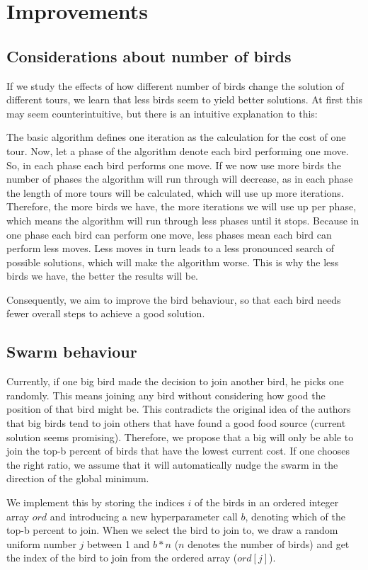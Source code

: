 \section{Improvements}
\subsection{Considerations about number of birds}
If we study the effects of how different number of birds change the solution of different tours, we learn that less birds seem to yield better solutions. At first this may seem counterintuitive, but there is an intuitive explanation to this:

The basic algorithm defines one iteration as the calculation for the cost of one tour. Now, let a phase of the algorithm denote each bird performing one move. So, in each phase each bird performs one move.
If we now use more birds the number of phases the algorithm will run through will decrease, as in each phase the length of more tours will be calculated, which will use up more iterations. Therefore, the more birds we have, the more iterations we will use up per phase, which means the algorithm will run through less phases until it stops. 
Because in one phase each bird can perform one move, less phases mean each bird can perform less moves. Less moves in turn leads to a less pronounced search of possible solutions, which will make the algorithm worse. This is why the less birds we have, the better the results will be.

Consequently, we aim to improve the bird behaviour, so that each bird needs fewer overall steps to achieve a good solution.

\subsection{Swarm behaviour}
Currently, if one big bird made the decision to join another bird, he picks one randomly.
This means joining any bird without considering how good the position of that bird might be. This contradicts the original idea of the authors that big birds tend to join others that have found a good food source (current solution seems promising).
Therefore, we propose that a big will only be able to join the top-b percent of birds that have the lowest current cost. If one chooses the right ratio, we assume that it will automatically nudge the swarm in the direction of the global minimum.

We implement this by storing the indices $i$ of the birds in an ordered integer array $ord$ and introducing a new hyperparameter call $b$, denoting which of the top-b percent to join. When we select the bird to join to, we draw a random uniform number $j$ between 1 and $b*n$ ($n$ denotes the number of birds) and get the index of the bird to join from the ordered array ($ord[j]$).

